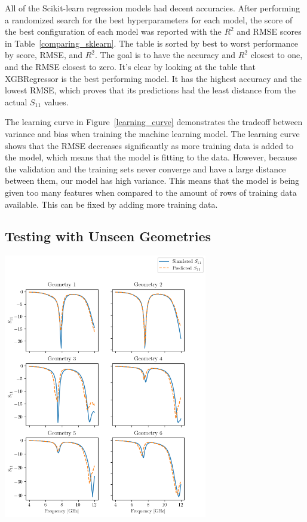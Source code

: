 \documentclass[conference]{IEEEtran}
\newenvironment{Figure}
    {\par\medskip\noindent\minipage{\linewidth}}
    {\endminipage\par\medskip}
\begin{document}
All of the Scikit-learn regression models had decent accuracies. After performing a randomized search for the best hyperparameters for each model, the score of the best configuration of each model was reported with the $R^2$ and RMSE scores in Table~\ref{comparing_sklearn}. The table is sorted by best to worst performance by score, RMSE, and $R^2$. The goal is to have the accuracy and $R^2$ closest to one, and the RMSE closest to zero. It's clear by looking at the table that XGBRegressor is the best performing model. It has the highest accuracy and the lowest RMSE, which proves that its predictions had the least distance from the actual $S_{11}$ values.

The learning curve in Figure~\ref{learning_curve} demonstrates the tradeoff between variance and bias when training the machine learning model. The learning curve shows that the RMSE decreases significantly as more training data is added to the model, which means that the model is fitting to the data. However, because the validation and the training sets never converge and have a large distance between them, our model has high variance. This means that the model is being given too many features when compared to the amount of rows of training data available. This can be fixed by adding more training data.


\subsection{Testing with Unseen Geometries}

\begin{Figure}
    \centering
    \includegraphics[width=3.5in]{unseen_geometries_freq_vs_seq}
    \label{unseen_geometries_graph}
\end{Figure}
\end{document}
